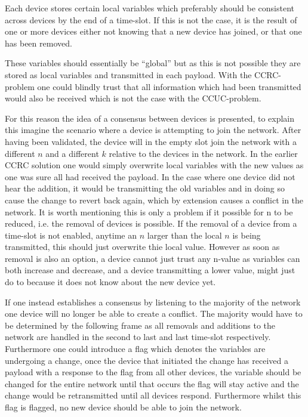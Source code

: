Each device stores certain local variables which preferably should be consistent across devices by the end of a time-slot.
If this is not the case, it is the result of one or more devices either not knowing that a new device has joined, or that one has been removed.

These variables should essentially be ``global'' but as this is not possible they are stored as local variables and transmitted in each payload.
With the CCRC-problem one could blindly trust that all information which had been transmitted would also be received which is not the case with the CCUC-problem.

\bigskip \noindent
For this reason the idea of a consensus between devices is presented, to explain this imagine the scenario where a device is attempting to join the network.
After having been validated, the device will in the empty slot join the network with a different $n$ and a different $k$ relative to the devices in the network.
In the earlier CCRC solution one would simply overwrite local variables with the new values as one was sure all had received the payload.
In the case where one device did not hear the addition, it would be transmitting the old variables and in doing so cause the change to revert back again, which by extension causes a conflict in the network.
It is worth mentioning this is only a problem if it possible for n to be reduced, i.e. the removal of devices is possible.
If the removal of a device from a time-slot is not enabled, anytime an $n$ larger than the local $n$ is being transmitted, this should just overwrite thie local value. 
However as soon as removal is also an option, a device cannot just trust any n-value as variables can both increase and decrease, and a device transmitting a lower value, might just do to because it does not know about the new device yet.

If one instead establishes a consensus by listening to the majority of the network one device will no longer be able to create a conflict.
The majority would have to be determined by the following frame as all removals and additions to the network are handled in the second to last and last time-slot respectively.
Furthermore one could introduce a flag which denotes the variables are undergoing a change, once the device that initiated the change has received a payload with a response to the flag from all other devices, the variable should be changed for the entire network until that occurs the flag will stay active and the change would be retransmitted until all devices respond.
Furthermore whilst this flag is flagged, no new device should be able to join the network.